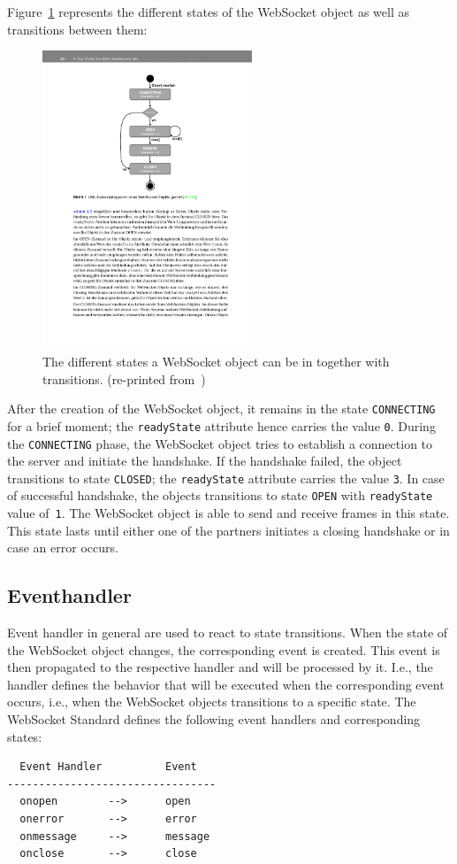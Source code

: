 \documentclass[a4paper, justified, notoc]{tufte-handout} %
\begin{document}
Figure~\ref{fig:states} represents the different states of the WebSocket object as well as transitions between them:
\begin{figure}%
	\centering
  \includegraphics[width=0.56\textwidth]{./src/figures/states.pdf}
  \caption{The different states a WebSocket object can be in together with transitions. (re-printed from~\citet{gorski:2015})}
  \label{fig:states}
\end{figure}

After the creation of the WebSocket object, it remains in the state \texttt{CONNECTING} for a brief moment; the \texttt{readyState} attribute hence carries the value \texttt{0}. During the \texttt{CONNECTING} phase, the WebSocket object tries to establish a connection to the server and initiate the handshake. If the handshake failed, the object transitions to state \texttt{CLOSED}; the \texttt{readyState} attribute carries the value \texttt{3}. In case of successful handshake, the objects transitions to state \texttt{OPEN} with \texttt{readyState} value of~\texttt{1}. The WebSocket object is able to send and receive frames in this state. This state lasts until either one of the partners initiates a closing handshake or in case an error occurs.

\subsection{Eventhandler} %
\label{sub:eventhandler}

Event handler in general are used to react to state transitions. When the state of the WebSocket object changes, the corresponding event is created. This event is then propagated to the respective handler and will be processed by it. I.e., the handler defines the behavior that will be executed when the corresponding event occurs, i.e., when the WebSocket objects transitions to a specific state. The WebSocket Standard defines the following event handlers and corresponding states:
\begin{Verbatim}
  Event Handler          Event
---------------------------------
  onopen        -->      open
  onerror       -->      error
  onmessage     -->      message
  onclose       -->      close
\end{Verbatim}
\end{document}
